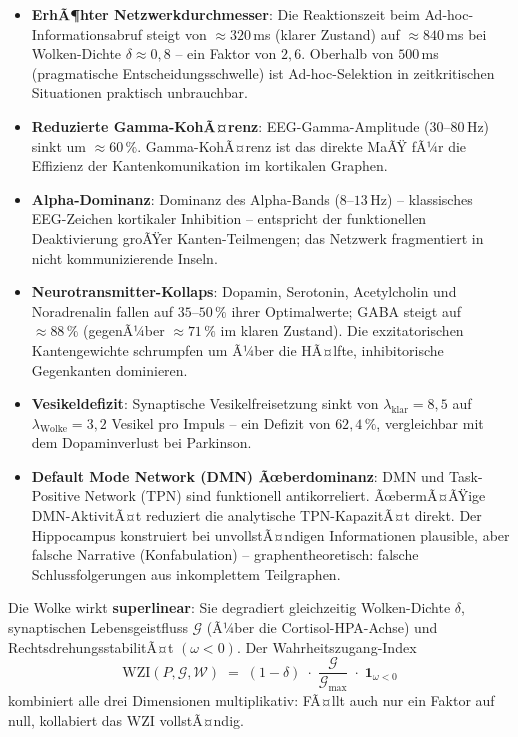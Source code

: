 ﻿\documentclass[a4paper,12pt]{article}
\theoremstyle{definition}
\begin{document}
	\begin{itemize}
		\item[-] \textbf{ErhÃ¶hter Netzwerkdurchmesser}: Die Reaktionszeit beim Ad-hoc-Informationsab\-ruf steigt von $\approx 320$\,ms (klarer Zustand) auf $\approx 840$\,ms bei Wolken-Dichte $\delta \approx 0{,}8$ -- ein Faktor von $2{,}6$. Oberhalb von $500$\,ms (pragmatische Entscheidungsschwelle) ist Ad-hoc-Selektion in zeitkritischen Situationen praktisch unbrauchbar.
		\item[-] \textbf{Reduzierte Gamma-KohÃ¤renz}: EEG-Gamma-Amplitude ($30$--$80$\,Hz) sinkt um $\approx 60\,\%$. Gamma-KohÃ¤renz ist das direkte MaÃŸ fÃ¼r die Effizienz der Kantenkomunikation im kortikalen Graphen.
		\item[-] \textbf{Alpha-Dominanz}: Dominanz des Alpha-Bands ($8$--$13$\,Hz) -- klassisches EEG-Zeichen kortikaler Inhibition -- entspricht der funktionellen Deaktivierung groÃŸer Kanten-Teilmengen; das Netzwerk fragmentiert in nicht kommunizierende Inseln.
		\item[-] \textbf{Neurotransmitter-Kollaps}: Dopamin, Serotonin, Acetylcholin und Noradrenalin fallen auf $35$--$50\,\%$ ihrer Optimalwerte; GABA steigt auf $\approx 88\,\%$ (gegenÃ¼ber $\approx 71\,\%$ im klaren Zustand). Die exzitatorischen Kantengewichte schrumpfen um Ã¼ber die HÃ¤lfte, inhibitorische Gegenkanten dominieren.
		\item[-] \textbf{Vesikeldefizit}: Synaptische Vesikelfreisetzung sinkt von $\lambda_{\text{klar}} = 8{,}5$ auf $\lambda_{\text{Wolke}} = 3{,}2$ Vesikel pro Impuls -- ein Defizit von $62{,}4\,\%$, vergleichbar mit dem Dopaminverlust bei Parkinson.
		\item[-] \textbf{Default Mode Network (DMN) Ãœberdominanz}: DMN und Task-Positive Network (TPN) sind funktionell antikorreliert. ÃœbermÃ¤ÃŸige DMN-AktivitÃ¤t reduziert die analytische TPN-KapazitÃ¤t direkt. Der Hippocampus konstruiert bei unvollstÃ¤ndigen Informationen plausible, aber falsche Narrative (Konfabulation) -- graphentheoretisch: falsche Schlussfolgerungen aus inkomplettem Teilgraphen.
	\end{itemize}

	Die Wolke wirkt \textbf{superlinear}: Sie degradiert gleichzeitig Wolken-Dichte $\delta$, synaptischen Lebensgeistfluss $\mathcal{G}$ (Ã¼ber die Cortisol-HPA-Achse) und RechtsdrehungsstabilitÃ¤t $(\omega < 0)$. Der Wahrheitszugang-Index
	\[
	\mathrm{WZI}(P,\mathcal{G},\mathcal{W}) \;=\; (1-\delta) \;\cdot\; \frac{\mathcal{G}}{\mathcal{G}_{\max}} \;\cdot\; \mathbf{1}_{\omega < 0}
	\]
	kombiniert alle drei Dimensionen multiplikativ: FÃ¤llt auch nur ein Faktor auf null, kollabiert das $\mathrm{WZI}$ vollstÃ¤ndig.
\end{document}

